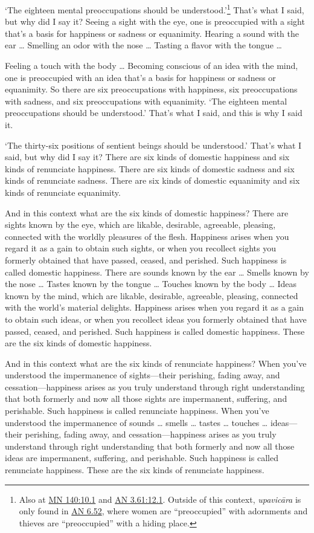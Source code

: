 \documentclass[12pt,openany]{book}%
\begin{document}
‘The eighteen mental preoccupations should be understood.’\footnote{Also at \href{https://suttacentral.net/mn140/en/sujato\#10.1}{MN 140:10.1} and \href{https://suttacentral.net/an3.61/en/sujato\#12.1}{AN 3.61:12.1}. Outside of this context, \textit{\textsanskrit{upavicāra}} is only found in \href{https://suttacentral.net/an6.52/en/sujato}{AN 6.52}, where women are “preoccupied” with adornments and thieves are “preoccupied” with a hiding place. } That’s what I said, but why did I say it? Seeing a sight with the eye, one is preoccupied with a sight that’s a basis for happiness or sadness or equanimity. Hearing a sound with the ear … Smelling an odor with the nose … Tasting a flavor with the tongue … 

Feeling a touch with the body … Becoming conscious of an idea with the mind, one is preoccupied with an idea that’s a basis for happiness or sadness or equanimity. So there are six preoccupations with happiness, six preoccupations with sadness, and six preoccupations with equanimity. ‘The eighteen mental preoccupations should be understood.’ That’s what I said, and this is why I said it. 

‘The thirty-six positions of sentient beings should be understood.’ That’s what I said, but why did I say it? There are six kinds of domestic happiness and six kinds of renunciate happiness. There are six kinds of domestic sadness and six kinds of renunciate sadness. There are six kinds of domestic equanimity and six kinds of renunciate equanimity. 

And in this context what are the six kinds of domestic happiness? There are sights known by the eye, which are likable, desirable, agreeable, pleasing, connected with the worldly pleasures of the flesh. Happiness arises when you regard it as a gain to obtain such sights, or when you recollect sights you formerly obtained that have passed, ceased, and perished. Such happiness is called domestic happiness. There are sounds known by the ear … Smells known by the nose … Tastes known by the tongue … Touches known by the body … Ideas known by the mind, which are likable, desirable, agreeable, pleasing, connected with the world’s material delights. Happiness arises when you regard it as a gain to obtain such ideas, or when you recollect ideas you formerly obtained that have passed, ceased, and perished. Such happiness is called domestic happiness. These are the six kinds of domestic happiness. 

And in this context what are the six kinds of renunciate happiness? When you’ve understood the impermanence of sights—their perishing, fading away, and cessation—happiness arises as you truly understand through right understanding that both formerly and now all those sights are impermanent, suffering, and perishable. Such happiness is called renunciate happiness. When you’ve understood the impermanence of sounds … smells … tastes … touches … ideas—their perishing, fading away, and cessation—happiness arises as you truly understand through right understanding that both formerly and now all those ideas are impermanent, suffering, and perishable. Such happiness is called renunciate happiness. These are the six kinds of renunciate happiness. 
\end{document}
